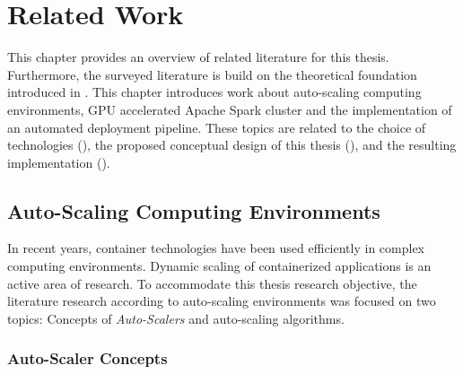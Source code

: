\chapter{Related Work}
\label{chap:03_related-work}


This chapter provides an overview of related literature for this thesis. Furthermore, the surveyed literature is build on the theoretical foundation introduced in . This chapter introduces work about auto-scaling computing environments, GPU accelerated Apache Spark cluster and the implementation of an automated deployment pipeline. These topics are related to the choice of technologies (), the proposed conceptual design of this thesis (), and the resulting implementation ().


\section{Auto-Scaling Computing Environments}
In recent years, container technologies have been used efficiently in complex computing environments. Dynamic scaling of containerized applications is an active area of research.
To accommodate this thesis research objective, the literature research according to auto-scaling environments was focused on two topics: Concepts of \textit{Auto-Scalers}  and auto-scaling algorithms.


\subsection{Auto-Scaler Concepts}
